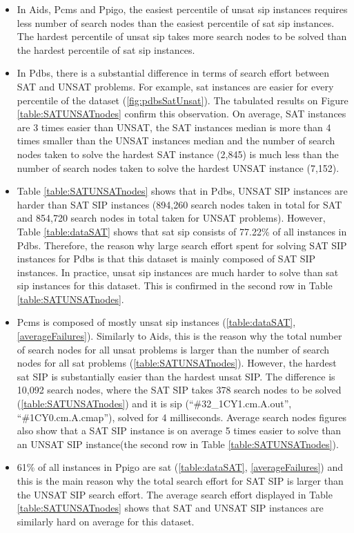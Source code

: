 \documentclass{l4proj}
\newcounter{example}[section]
\begin{document}
\begin{itemize}
\item In Aids, Pcms and Ppigo, the easiest percentile of \gls{unsat} \gls{sip} instances requires less number of search nodes than the easiest percentile of \gls{sat} \gls{sip} instances. The hardest percentile of \gls{unsat} \gls{sip} takes more search nodes to be solved than the hardest percentile of \gls{sat} \gls{sip} instances.

\item In Pdbs, there is a substantial difference in terms of search effort between SAT and UNSAT problems. For example, \gls{sat} instances are easier for every percentile of the dataset (\ref{fig:pdbsSatUnsat}). The tabulated results on Figure \ref{table:SATUNSATnodes} confirm this observation. On average, SAT instances are 3 times easier than UNSAT, the SAT instances median is more than 4 times smaller than the UNSAT instances median and the number of search nodes taken to solve the hardest SAT instance (2,845) is much less than the number of search nodes taken to solve the hardest UNSAT instance (7,152).

\item Table \ref{table:SATUNSATnodes} shows that in Pdbs, UNSAT SIP instances are harder than SAT SIP instances (894,260 search nodes taken in total for SAT and 854,720 search nodes in total taken for UNSAT problems). However, Table \ref{table:dataSAT} shows that \gls{sat} \gls{sip} consists of 77.22\% of all instances in Pdbs. Therefore, the reason why large search effort spent for solving SAT SIP instances for Pdbs is that this dataset is mainly composed of SAT SIP instances. In practice, \gls{unsat} \gls{sip} instances are much harder to solve than \gls{sat} \gls{sip} instances for this dataset. This is confirmed in the second row in Table \ref{table:SATUNSATnodes}.

\item Pcms is composed of mostly \gls{unsat} \gls{sip} instances (\ref{table:dataSAT}, \ref{averageFailures}). Similarly to Aids, this is the reason why the total number of search nodes for all \gls{unsat} problems is larger than the number of search nodes for all \gls{sat} problems (\ref{table:SATUNSATnodes}). However, the hardest \gls{sat} SIP is substantially easier than the hardest \gls{unsat} SIP. The difference is 10,092 search nodes, where the SAT SIP takes 378 search nodes to be solved (\ref{table:SATUNSATnodes}) and it is \gls{sip} (``\#32\_1CY1.cm.A.out'', ``\#1CY0.cm.A.cmap''), solved for 4 milliseconds. Average search nodes figures also show that a SAT SIP instance is on average 5 times easier to solve than an UNSAT SIP instance(the second row in Table \ref{table:SATUNSATnodes}).

\item 61\% of all instances in Ppigo are \gls{sat} (\ref{table:dataSAT}, \ref{averageFailures}) and this is the main reason why the total search effort for SAT SIP is larger than the UNSAT SIP search effort. The average search effort displayed in Table \ref{table:SATUNSATnodes} shows that SAT and UNSAT SIP instances are similarly hard on average for this dataset.
\end{itemize}
\end{document}
